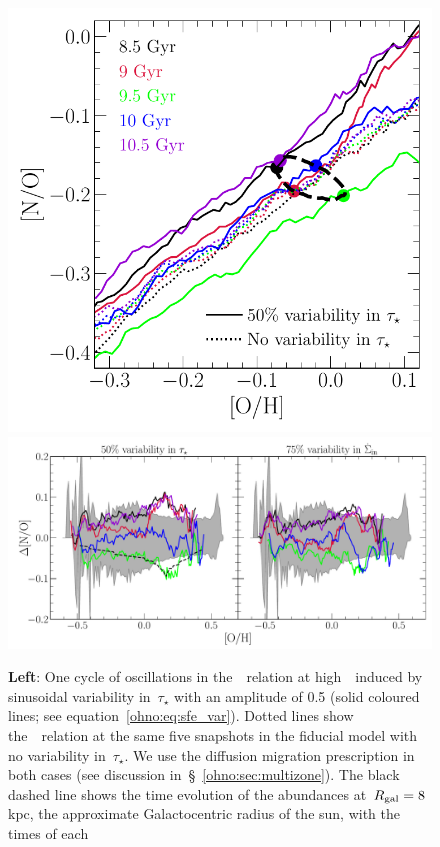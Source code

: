 \begin{figure}
\centering
\includegraphics[scale = 0.44]{no_oh_sfevar.pdf}
\includegraphics[scale = 0.47]{delta_no_schaefercomp.pdf}
\caption{
\textbf{Left}: One cycle of oscillations in the~\ohno~relation at
high~\oh~induced by sinusoidal variability in~$\tau_\star$ with an amplitude of
0.5 (solid coloured lines; see equation~\ref{ohno:eq:sfe_var}).
Dotted lines show the~\ohno~relation at the same five snapshots in the fiducial
model with no variability in~$\tau_\star$.
We use the diffusion migration prescription in both cases (see discussion
in~\S~\ref{ohno:sec:multizone}).
The black dashed line shows the time evolution of the abundances at~$R_\text{gal} = 8$
kpc, the approximate Galactocentric radius of the sun, with the times of each
}
\end{figure}
